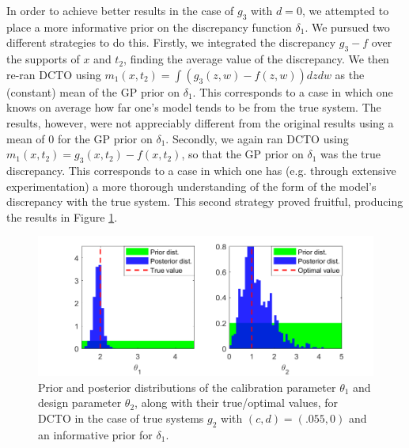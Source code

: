 \documentclass[12pt]{article}
\begin{document}
%
In order to achieve better results in the case of $g_3$ with $d=0$, we attempted to place a more informative prior on the discrepancy function $\delta_1$.
%
We pursued two different strategies to do this.
%
Firstly, we integrated the discrepancy $g_3-f$ over the supports of $x$ and $t_2$, finding the average value of the discrepancy.
%
We then re-ran DCTO using $m_1(x,t_2)=\int (g_3(z,w)-f(z,w))dzdw$ as the (constant) mean of the GP prior on $\delta_1$.
%
This corresponds to a case in which one knows on average how far one's model tends to be from the true system.
%
The results, however, were not appreciably different from the original results using a mean of 0 for the GP prior on $\delta_1$.
%
Secondly, we again ran DCTO using $m_1(x,t_2) = g_3(x,t_2)-f(x,t_2)$, so that the GP prior on $\delta_1$ was the true discrepancy.
%
This corresponds to a case in which one has (e.g. through extensive experimentation) a more thorough understanding of the form of the model's discrepancy with the true system.
%
This second strategy proved fruitful, producing the results in Figure \ref{fig:3_informative_discrep_results}.
%
\begin{figure}
\centering
\includegraphics[scale=0.85]{FIG_inf_discrepancy_results}
\captionsetup{width=.85\linewidth}
\caption{Prior and posterior distributions of the calibration parameter $\theta_1$ and design parameter $\theta_2$, along with their true/optimal values, for DCTO in the case of true systems $g_2$ with $(c,d)=(.055,0)$ and an informative prior for $\delta_1$.}
\label{fig:3_informative_discrep_results}
\end{figure}
%

\bigskip

%
%
%
%




\end{document}
